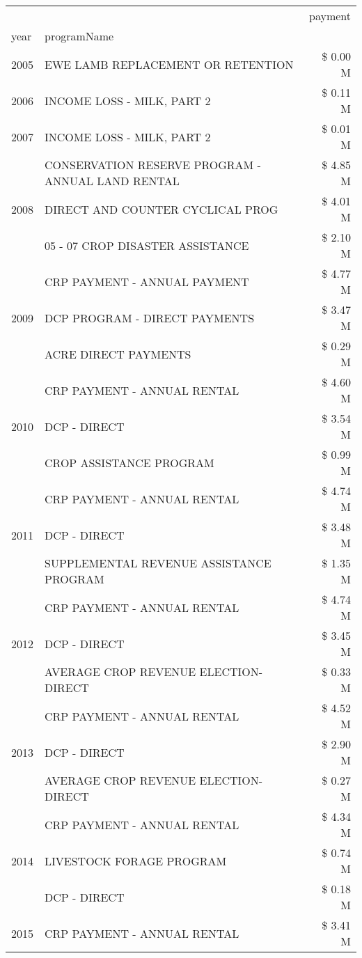 \begin{tabular}{llr}
\toprule
 &  & payment \\
year & programName &  \\
\midrule
2005 & EWE LAMB REPLACEMENT OR RETENTION & \$ 0.00 M \\
\cline{1-3}
2006 & INCOME LOSS - MILK, PART 2 & \$ 0.11 M \\
\cline{1-3}
2007 & INCOME LOSS - MILK, PART 2 & \$ 0.01 M \\
\cline{1-3}
\multirow[t]{3}{*}{2008} & CONSERVATION RESERVE PROGRAM - ANNUAL LAND RENTAL & \$ 4.85 M \\
 & DIRECT AND COUNTER CYCLICAL PROG & \$ 4.01 M \\
 & 05 - 07 CROP DISASTER ASSISTANCE & \$ 2.10 M \\
\cline{1-3}
\multirow[t]{3}{*}{2009} & CRP PAYMENT - ANNUAL PAYMENT & \$ 4.77 M \\
 & DCP PROGRAM - DIRECT PAYMENTS & \$ 3.47 M \\
 & ACRE DIRECT PAYMENTS & \$ 0.29 M \\
\cline{1-3}
\multirow[t]{3}{*}{2010} & CRP PAYMENT - ANNUAL RENTAL & \$ 4.60 M \\
 & DCP - DIRECT & \$ 3.54 M \\
 & CROP ASSISTANCE PROGRAM & \$ 0.99 M \\
\cline{1-3}
\multirow[t]{3}{*}{2011} & CRP PAYMENT - ANNUAL RENTAL & \$ 4.74 M \\
 & DCP - DIRECT & \$ 3.48 M \\
 & SUPPLEMENTAL REVENUE ASSISTANCE PROGRAM & \$ 1.35 M \\
\cline{1-3}
\multirow[t]{3}{*}{2012} & CRP PAYMENT - ANNUAL RENTAL & \$ 4.74 M \\
 & DCP - DIRECT & \$ 3.45 M \\
 & AVERAGE CROP REVENUE ELECTION-DIRECT & \$ 0.33 M \\
\cline{1-3}
\multirow[t]{3}{*}{2013} & CRP PAYMENT - ANNUAL RENTAL & \$ 4.52 M \\
 & DCP - DIRECT & \$ 2.90 M \\
 & AVERAGE CROP REVENUE ELECTION-DIRECT & \$ 0.27 M \\
\cline{1-3}
\multirow[t]{3}{*}{2014} & CRP PAYMENT - ANNUAL RENTAL & \$ 4.34 M \\
 & LIVESTOCK FORAGE PROGRAM & \$ 0.74 M \\
 & DCP - DIRECT & \$ 0.18 M \\
\cline{1-3}
\multirow[t]{3}{*}{2015} & CRP PAYMENT - ANNUAL RENTAL & \$ 3.41 M \\

\end{tabular}
